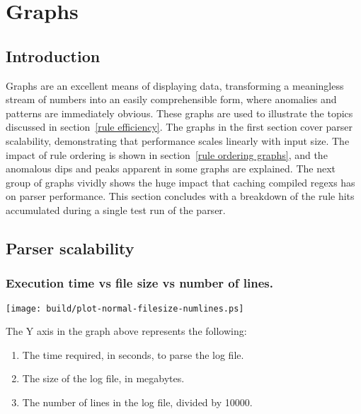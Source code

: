 \documentclass[a4paper,12pt,draft]{article}
\begin{document}


\label{bibliography}

\section{Graphs}

\label{graphs}

\subsection{Introduction}

Graphs are an excellent means of displaying data, transforming a
meaningless stream of numbers into an easily comprehensible form, where
anomalies and patterns are immediately obvious.  These graphs are used to
illustrate the topics discussed in section~\ref{rule efficiency}.  The
graphs in the first section cover parser scalability, demonstrating that
performance scales linearly with input size.  The impact of rule ordering
is shown in section~\ref{rule ordering graphs}, and the anomalous dips and
peaks apparent in some graphs are explained.  The next group of graphs
vividly shows the huge impact that caching compiled regexs has on parser
performance.  This section concludes with a breakdown of the rule hits
accumulated during a single test run of the parser.

\subsection{Parser scalability}

\subsubsection{Execution time vs file size vs number of lines.}
\label{execution time vs file size vs number lines}

\noindent
\texttt{[image: build/plot-normal-filesize-numlines.ps]}

The Y axis in the graph above represents the following:

\begin{enumerate}

    \item The time required, in seconds, to parse the log file.

    \item The size of the log file, in megabytes.

    \item The number of lines in the log file, divided by 10000.

\end{enumerate}
\end{document}
